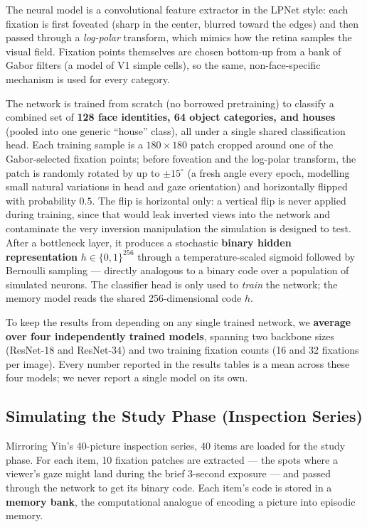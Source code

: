 \documentclass[11pt]{article}
\begin{document}
The neural model is a convolutional feature extractor in the LPNet style: each fixation is
first foveated (sharp in the center, blurred toward the edges) and then passed through a
\emph{log-polar} transform, which mimics how the retina samples the visual field. Fixation
points themselves are chosen bottom-up from a bank of Gabor filters (a model of V1 simple
cells), so the same, non-face-specific mechanism is used for every category.

The network is trained from scratch (no borrowed pretraining) to classify a combined set of
\textbf{128 face identities, 64 object categories, and houses} (pooled into one generic
``house'' class), all under a single shared classification head. Each training sample is a
$180 \times 180$ patch cropped around one of the Gabor-selected fixation points; before
foveation and the log-polar transform, the patch is randomly rotated by up to $\pm 15^\circ$
(a fresh angle every epoch, modelling small natural variations in head and gaze orientation)
and horizontally flipped with probability $0.5$. The flip is horizontal only: a vertical flip
is never applied during training, since that would leak inverted views into the network and
contaminate the very inversion manipulation the simulation is designed to test. After a bottleneck layer, it
produces a stochastic \textbf{binary hidden representation} $h \in \{0,1\}^{256}$ through a
temperature-scaled sigmoid followed by Bernoulli sampling --- directly analogous to a binary
code over a population of simulated neurons. The classifier head is only used to \emph{train}
the network; the memory model reads the shared 256-dimensional code $h$.

To keep the results from depending on any single trained network, we \textbf{average over
four independently trained models}, spanning two backbone sizes (ResNet-18 and ResNet-34)
and two training fixation counts (16 and 32 fixations per image). Every number reported in
the results tables is a mean across these four models; we never report a single model on its
own.

\subsection{Simulating the Study Phase (Inspection Series)}

Mirroring Yin's 40-picture inspection series, 40 items are loaded for the study phase. For
each item, 10 fixation patches are extracted --- the spots where a viewer's gaze might land
during the brief 3-second exposure --- and passed through the network to get its binary code.
Each item's code is stored in a \textbf{memory bank}, the computational analogue of encoding
a picture into episodic memory.
\end{document}
